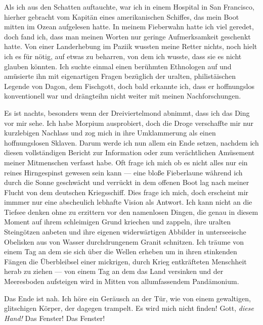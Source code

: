 \documentclass[a4paper]{memoir}
\begin{document}
Als ich aus den Schatten auftauchte, war ich in einem Hospital in San Francisco, hierher gebracht vom Kapitän eines amerikanischen Schiffes, das mein Boot mitten im Ozean aufgelesen hatte. In meinem Fieberwahn hatte ich viel geredet, doch fand ich, dass man meinen Worten nur geringe Aufmerksamkeit geschenkt hatte. Von einer Landerhebung im Paziik wussten meine Retter nichts, noch hielt ich es für nötig, auf etwas zu beharren, von dem ich wusste, dass sie es nicht glauben könnten. Ich suchte einmal einen berühmten Ethnologen auf und amüsierte ihn mit eigenartigen Fragen bezüglich der uralten, philistäischen Legende von Dagon, dem Fischgott, doch bald erkannte ich, dass er hoffnungslos konventionell war und drängteihn nicht weiter mit meinen Nachforschungen.

Es ist nachts, besonders wenn der Dreiviertelmond abnimmt, dass ich das Ding vor mir sehe. Ich habe Morpium ausprobiert, doch die Droge verschaffte mir nur kurzlebigen Nachlass und zog mich in ihre Umklammerung als einen hoffnungslosen Sklaven. Darum werde ich nun allem ein Ende setzen, nachdem ich diesen vollständigen Bericht zur Information oder zum verächtlichen Amüsement meiner Mitmenschen verfasst habe. Oft frage ich mich ob es nicht alles nur ein reines Hirngespinst gewesen sein kann --- eine bloße Fieberlaune während ich durch die Sonne geschwächt und verrückt in dem offenen Boot lag nach meiner Flucht von dem deutschen Kriegsschiff. Dies frage ich mich, doch erscheint mir immmer nur eine abscheulich lebhafte Vision als Antwort. Ich kann nicht an die Tiefsee denken ohne zu erzittern vor den namenlosen Dingen, die genau in diesem Moment auf ihrem schleimigen Grund kriechen und zappeln, ihre uralten Steingötzen anbeten und ihre eigenen widerwärtigen Abbilder in unterseeische Obelisken aus von Wasser durchdrungenem Granit schnitzen. Ich träume von einem Tag an dem sie sich über die Wellen erheben um in ihren stinkenden Fängen die Überbleibsel einer mickrigen, durch Krieg entkräfteten Menschheit herab zu ziehen --- von einem Tag an dem das Land versinken und der Meeresboden aufsteigen wird in Mitten von allumfassendem Pandämonium.

Das Ende ist nah. Ich höre ein Geräusch an der Tür, wie von einem gewaltigen, glitschigen Körper, der dagegen trampelt. Es wird mich nicht finden! Gott, \textit{diese Hand!} Das Fenster! Das Fenster!
\end{document}
